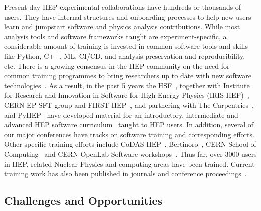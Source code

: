 \documentclass[10pt,a4paper]{article}
\begin{document}
Present day HEP experimental collaborations have hundreds or thousands of users.
They have internal structures and onboarding processes to help new users learn
and jumpstart software and physics analysis contributions. While most analysis
tools and software frameworks taught are experiment-specific, a considerable
amount of training is invested in common software tools and skills like Python,
C++, ML, CI/CD, and analysis preservation and reproducibility, etc. There is a
growing consensus in the HEP community on the need for common training programmes
to bring researchers up to date with new software
technologies~\cite{HSF-CWP-2017-02, Snowmass:2021_community_engagement_frontier, Snowmass:2021_CEF_report, Snowmass:2021_career_pipeline}.
As a result, in the past 5 years the HSF~\cite{HSFTraining}, together with Institute for
Research and Innovation in Software for High Energy Physics (IRIS-HEP)~\cite{IRISHEP:Training},
CERN EP-SFT group and FIRST-HEP~\cite{FIRST-HEP}, and partnering with The
Carpentries~\cite{TheCarpentries}, and PyHEP~\cite{HSFPyHEP} have developed material for an
introductory, intermediate and advanced HEP software curriculum~\cite{HSFTrainingCenter} taught
to HEP users. In addition, several of our major conferences have tracks on
software training and corresponding efforts. Other specific training efforts
include CoDAS-HEP~\cite{CODAS-HEP}, Bertinoro~\cite{INFN:ESC_school}, CERN School of
Computing~\cite{CERN:computing_school} and CERN OpenLab Software
workshops~\cite{CERN:SW_workshops}. Thus far,
over 3000 users in HEP, related Nuclear Physics and computing areas have been
trained. Current training work has also been published in journals and
conference proceedings~\cite{Malik:2919564, Malik:chep2023_training_outreach, Malik2021Software, 10.3389/fdata.2025.1497622}.

\subsection{Challenges and
Opportunities}\label{challenges-and-opportunities}
\end{document}
